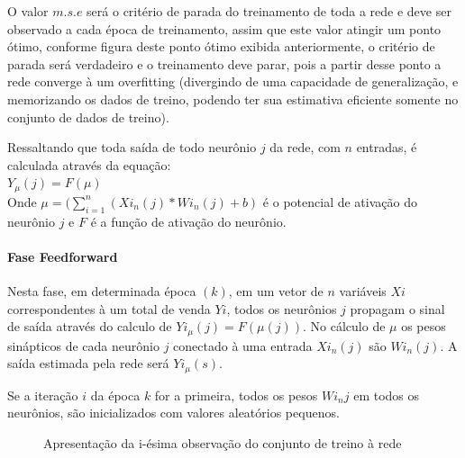 \documentclass[	12pt, Times, openright, twoside, a4paper, english, brazil]{abntex2}
\begin{document}
            O valor $m.s.e$ será o critério de parada do treinamento de toda a rede e deve ser observado a cada época de treinamento, assim que este valor atingir um ponto ótimo, conforme figura deste ponto ótimo exibida anteriormente, o critério de parada será verdadeiro e o treinamento deve parar, pois a partir desse ponto a rede converge à um overfitting (divergindo de uma capacidade de generalização, e memorizando os dados de treino, podendo ter sua estimativa eficiente somente no conjunto de dados de treino).
            
            Ressaltando que toda saída de todo neurônio $j$ da rede, com $n$ entradas, é calculada através da equação:\\
            $ Y_{\mu}(j) = F(\mu)$\\
            Onde $\mu = (\sum_{i=1}^{n} (Xi_{n}(j)*Wi_{n}(j) + b)$ é o potencial de ativação do neurônio $j$ e $F$ é a função de ativação do neurônio.
            
           \paragraph*{Fase Feedforward}
            Nesta fase, em determinada época $(k)$, em um vetor de $n$ variáveis $Xi$ correspondentes à um total de venda $Yi$, todos os neurônios $j$ propagam o sinal de saída através do calculo de $Yi_{\mu}(j) = F(\mu(j))$. No cálculo de $\mu$ os pesos sinápticos de cada neurônio $j$ conectado à uma entrada $Xi_{n}(j)$ são $Wi_{n}(j)$. A saída estimada pela rede será $Yi_{\mu}(s)$.
            
            Se a iteração $i$ da época $k$ for a primeira, todos os pesos $Wi_{n}j$ em todos os neurônios, são inicializados com valores aleatórios pequenos.\\ 
            
            
            \begin{figure}[!ht]
          	\caption{Apresentação da i-ésima observação do conjunto de treino à rede}
           \end{figure}
           
\end{document}
